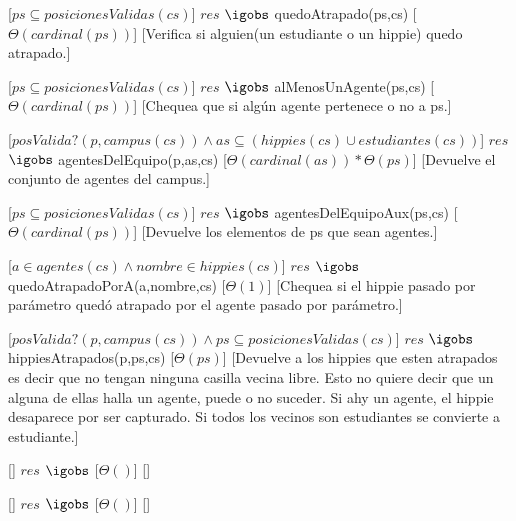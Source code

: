   [$ps \subseteq posicionesValidas(cs)$]
  {$res$ $\igobs$ quedoAtrapado(ps,cs)}
  [$\Theta(cardinal(ps))$]
  [Verifica si alguien(un estudiante o un hippie) quedo atrapado.]  

  [$ps \subseteq posicionesValidas(cs)$]
  {$res$ $\igobs$ alMenosUnAgente(ps,cs)}
  [$\Theta(cardinal(ps))$]
  [Chequea que si algún agente pertenece o no a ps.]  

  [$posValida?(p,campus(cs)) \land as \subseteq (hippies(cs) \cup estudiantes(cs))$]
  {$res$ $\igobs$ agentesDelEquipo(p,as,cs)}
  [$\Theta(cardinal(as)) * \Theta(ps)$]
  [Devuelve el conjunto de agentes del campus.]  

  [$ps \subseteq posicionesValidas(cs)$]
  {$res$ $\igobs$ agentesDelEquipoAux(ps,cs)}
  [$\Theta(cardinal(ps))$]
  [Devuelve los elementos de ps que sean agentes.]  
 
  [$a \in agentes(cs) \land nombre \in hippies(cs)$]
  {$res$ $\igobs$ quedoAtrapadoPorA(a,nombre,cs)}
  [$\Theta(1)$]
  [Chequea si el hippie pasado por parámetro quedó atrapado por el agente pasado por parámetro.]  

  [$posValida?(p,campus(cs)) \land ps \subseteq posicionesValidas(cs)$]
  {$res$ $\igobs$ hippiesAtrapados(p,ps,cs)}
  [$\Theta(ps)$] %
  [Devuelve a los hippies que esten atrapados es decir que no tengan ninguna casilla vecina libre. Esto no quiere decir que un alguna de ellas halla un agente, puede o no suceder. Si ahy un agente, el hippie desaparece por ser capturado. Si todos los vecinos son estudiantes se convierte a estudiante.]  

  []
  {$res$ $\igobs$}
  [$\Theta()$]
  []  

  []
  {$res$ $\igobs$}
  [$\Theta()$]
  []  

